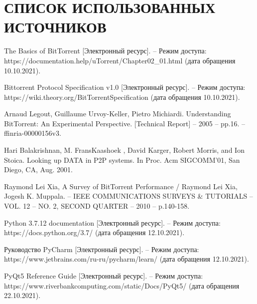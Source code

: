\section*{СПИСОК ИСПОЛЬЗОВАННЫХ ИСТОЧНИКОВ}

\begin{thebibliography}{9}
	 The Basics of BitTorrent [Электронный ресурс]. -- Режим доступа: https://documentation.help/uTorrent/Chapter02\_01.html (дата обращения 10.10.2021).
	
	 Bittorrent Protocol Specification v1.0 [Электронный ресурс]. -- Режим доступа: https://wiki.theory.org/BitTorrentSpecification (дата обращения 10.10.2021).
	
	 Arnaud Legout, Guillaume Urvoy-Keller, Pietro Michiardi. Understanding BitTorrent: An Experimental Perspective. [Technical Report] -- 2005 -- pp.16. -- ffinria-00000156v3.
	
	
	 Hari Balakrishnan, M. FransKaashoek , David Karger, Robert Morris, and Ion Stoica. Looking up DATA in P2P systems. In Proc. Acm SIGCOMM’01, San Diego, CA, Aug. 2001.
	
	 Raymond Lei Xia, A Survey of BitTorrent Performance / Raymond Lei Xia,  Jogesh K. Muppala. -- IEEE COMMUNICATIONS SURVEYS \& TUTORIALS --  VOL. 12 -- NO. 2, SECOND QUARTER -- 2010 -- p.140-158.
	
	 Python 3.7.12 documentation  [Электронный ресурс]. -- Режим доступа: https://docs.python.org/3.7/ (дата обращения 12.10.2021).
	
	 Руководство PyCharm [Электронный ресурс]. -- Режим доступа: https://www.jetbrains.com/ru-ru/pycharm/learn/ (дата обращения 12.10.2021).
	
	 PyQt5 Reference Guide [Электронный ресурс]. -- Режим доступа: https://www.riverbankcomputing.com/static/Docs/PyQt5/ (дата обращения 22.10.2021).
	
\end{thebibliography}